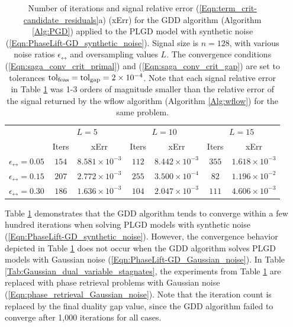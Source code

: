 \begin{table}[H]
\centering
\begin{tabular}{ |c|cc|cc|cc| }
 \hline

 	&	\multicolumn{2}{c|}{$L = 5$}
 		&	\multicolumn{2}{c|}{$L = 10$}
 			&	\multicolumn{2}{c|}{$L = 15$}	\\
 	&	 Iters	&	xErr
 		&	Iters	&	xErr
 			&	Iters	&	xErr		\\  			
 \hline
$\epsilon_\rel = 0.05$
	&	$154$ & $8.581 \times 10^{-3}$
		&	$112$ & $8.442 \times 10^{-3}$
			&	$355$ & $ 1.618 \times 10^{-3}$ \\
$\epsilon_\rel = 0.15$
	&	$207$ & $2.772 \times 10^{-3}$
		&	$255$ & $3.500 \times 10^{-4}$
			&	$82$ & $1.196 \times 10^{-2} $ \\
$\epsilon_\rel = 0.30$
	&	$186$ & $1.636 \times 10^{-3}$
		&	$104$ & $2.047 \times 10^{-3}$
			&	$111$ & $4.606 \times 10^{-3}$ \\
 \hline
\end{tabular}
\vspace{0.5cm}
\caption{Number of iterations and signal relative error (\ref{Eqn:term_crit-candidate_residuals}a) (xErr) for the GDD algorithm (Algorithm \ref{Alg:PGD}) applied to the PLGD model with synthetic noise (\ref{Eqn:PhaseLift-GD_synthetic_noise}).  Signal size is $n=128$, with various noise ratios $\epsilon_\rel$ and oversampling values $L$.  The convergence conditions (\ref{Eqn:saga_conv_crit_primal}) and (\ref{Eqn:saga_conv_crit_gap}) are set to tolerances $\textnormal{tol}_\textnormal{feas} = \textnormal{tol}_\textnormal{gap} = 2 \times 10^{-4}$.  Note that each signal relative error in Table \ref{Tab:synthetic_dual_variable_converges} was 1-3 orders of magnitude smaller than the relative error of the signal returned by the  wflow algorithm (Algorithm \ref{Alg:wflow}) for the same problem.} 
\label{Tab:synthetic_dual_variable_converges}
\end{table}


Table \ref{Tab:synthetic_dual_variable_converges} demonstrates that the GDD algorithm tends to converge within a few hundred iterations when solving PLGD models with synthetic noise (\ref{Eqn:PhaseLift-GD_synthetic_noise}).  However, the convergence behavior depicted in Table \ref{Tab:synthetic_dual_variable_converges} does not occur when the GDD algorithm solves PLGD models with Gaussian noise (\ref{Eqn:PhaseLift-GD_Gaussian_noise}).  In Table \ref{Tab:Gaussian_dual_variable_stagnates}, the experiments from Table \ref{Tab:synthetic_dual_variable_converges} are replaced with phase retrieval problems with Gaussian noise (\ref{Eqn:phase_retrieval_Gaussian_noise}).  Note that the iteration count is replaced by the final duality gap value, since the GDD algorithm failed to converge after 1,000 iterations for all cases.


